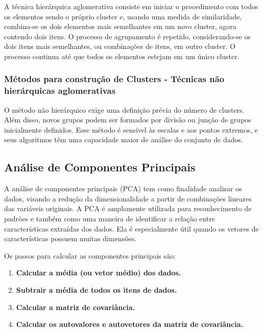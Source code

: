 \documentclass[
]{estat/estat}
\providecommand{\tightlist}{%
  \setlength{\itemsep}{0pt}\setlength{\parskip}{0pt}}\usepackage{longtable,booktabs,array}
\begin{document}
A técnica hierárquica aglomerativa consiste em iniciar o procedimento
com todos os elementos sendo o próprio cluster e, usando uma medida de
similaridade, combina-se os dois elementos mais semelhantes em um novo
cluster, agora contendo dois itens. O processo de agrupamento é
repetido, considerando-se os dois itens mais semelhantes, ou combinações
de itens, em outro cluster. O processo continua até que todos os
elementos estejam em um único cluster.

\subsubsection{Métodos para construção de Clusters - Técnicas não
hierárquicas
aglomerativas}\label{muxe9todos-para-construuxe7uxe3o-de-clusters---tuxe9cnicas-nuxe3o-hieruxe1rquicas-aglomerativas}

O método não hierárquico exige uma definição prévia do número de
clusters. Além disso, novos grupos podem ser formados por divisão ou
junção de grupos inicialmente definidos. Esse método é sensível às
escalas e aos pontos extremos, e seus algoritmos têm uma capacidade
maior de análise do conjunto de dados.

\subsection{Análise de Componentes
Principais}\label{anuxe1lise-de-componentes-principais}

A análise de componentes principais (PCA) tem como finalidade analisar
os dados, visando a redução da dimensionalidade a partir de combinações
lineares das variáveis originais. A PCA é amplamente utilizada para
reconhecimento de padrões e também como uma maneira de identificar a
relação entre características extraídas dos dados. Ela é especialmente
útil quando os vetores de características possuem muitas dimensões.

Os passos para calcular as componentes principais são:

\begin{enumerate}
\def\labelenumi{\arabic{enumi}.}
\tightlist
\item
  \textbf{Calcular a média (ou vetor médio) dos dados.}
\item
  \textbf{Subtrair a média de todos os itens de dados.}
\item
  \textbf{Calcular a matriz de covariância.}
\item
  \textbf{Calcular os autovalores e autovetores da matriz de
  covariância.}
\end{enumerate}
\end{document}
